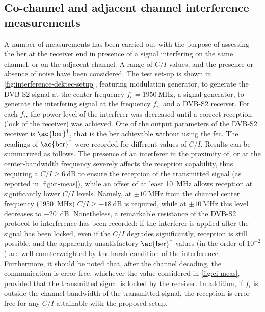 \documentclass[conference,10pt,a4paper]{IEEEtran}%
\begin{document}
\subsection{Co-channel and adjacent channel interference measurements}
A number of measurements has been carried out with the purpose of assessing the \ac{ber} at the receiver end in presence of a signal interfering on the same channel, or on the adjacent channel.
A range of $C/I$ values, and the presence or absence of noise have been considered.
The test set-up is shown in \cref{fig:interference-dektec-setup}, featuring modulation generator, to generate the DVB-S2 signal at the center frequency $f_c = \SI{1950}{\MHz}$, a signal generator, to generate the interfering signal at the frequency $f_i$, and a DVB-S2 receiver.
For each $f_i$, the power level of the interferer was decreased until a correct reception (lock of the receiver) was achieved.
One of the output parameters of the DVB-S2 receiver is $\text{\ac{ber}}^\dagger$, that is the \ac{ber} achievable without using the \ac{fec}.
The readings of $\text{\ac{ber}}^\dagger$ were recorded for different values of $C/I$.
Results can be summarized as follows.
The presence of an interferer in the proximity of, or at the center-bandwidth frequency severely affects the reception capability, thus requiring a $C/I \geqslant \SI{6}{\deci\bel}$ to ensure the reception of the transmitted signal (as reported in \cref{fig:ci-meas}), while an offset of at least \SI{10}{\mega\Hz} allows reception at significantly lower $C/I$ levels.
Namely, at $\pm\SI{10}{\MHz}$ from the channel center frequency (\SI{1950}{\MHz}) $C/I \geqslant \SI{-18}{\dB}$ is required, while at $\pm\SI{10}{\MHz}$ this level decreases to \SI{-20}{\dB}.
Nonetheless, a remarkable resistance of the DVB-S2 protocol to interference has been recorded: if the interferer is applied after the signal has been locked, even if the $C/I$ degrades significantly, reception is still possible, and the apparently unsatisfactory $\text{\ac{ber}}^\dagger$ values (in the order of $10^{-2}$) are well counterweighted by the harsh condition of the interference.
Furthermore, it should be noted that, after the channel decoding, the communication is error-free, whichever the value considered in \cref{fig:ci-meas}, provided that the transmitted signal is locked by the receiver.
In addition, if $f_i$ is outside the channel bandwidth of the transmitted signal, the reception is error-free for any $C/I$ attainable with the proposed setup.
\end{document}
